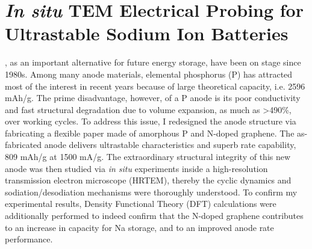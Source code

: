

\chapter{\emph{In situ} TEM Electrical Probing for Ultrastable Sodium Ion Batteries}

, as an important alternative for future energy storage, have been on stage since 1980s. Among many anode materials, elemental phosphorus (P) has attracted most of the interest in recent years because of large theoretical capacity, i.e. 2596 mAh/g. The prime disadvantage, however, of a P anode is its poor conductivity and fast structural degradation due to volume expansion, as much as >490\%, over working cycles. To address this issue, I redesigned the anode structure via fabricating a flexible paper made of amorphous P and N-doped graphene. The as-fabricated anode delivers ultrastable characteristics and superb rate capability, 809 mAh/g at 1500 mA/g. The extraordinary structural integrity of this new anode was then studied via \emph{in situ} experiments inside a high-resolution transmission electron microscope (HRTEM), thereby the cyclic dynamics and sodiation/desodiation mechanisms were thoroughly understood. To confirm my experimental results, Density Functional Theory (DFT) calculations were additionally performed to indeed confirm that the N-doped graphene contributes to an increase in capacity for Na storage, and to an improved anode rate performance.

